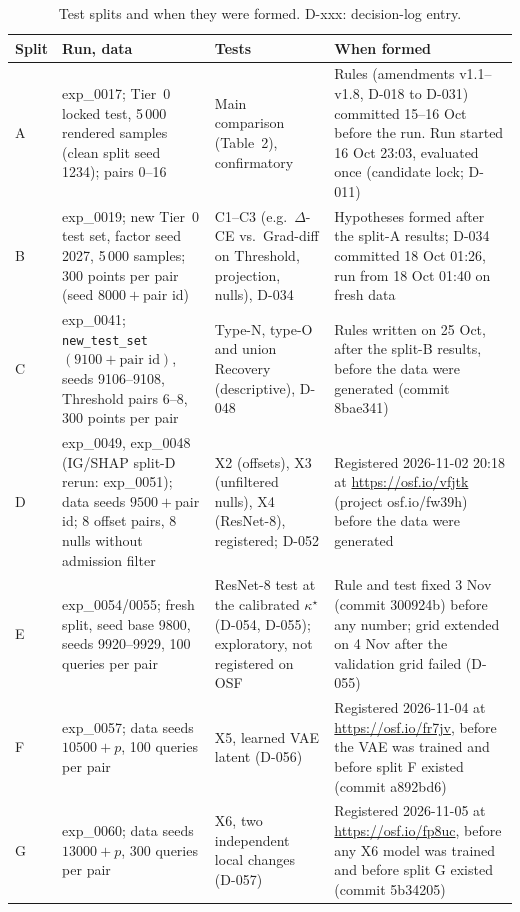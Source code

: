 \documentclass[10pt,a4paper]{article}
\theoremstyle{remark}
\begin{document}
\begin{table}[h]
\caption{Test splits and when they were formed. D-xxx: decision-log entry.}\label{tab:splits}
\centering\scriptsize
\setlength{\tabcolsep}{3pt}
\begin{tabular}{@{}l>{\raggedright\arraybackslash}p{2.6cm}>{\raggedright\arraybackslash}p{4.0cm}>{\raggedright\arraybackslash}p{5.2cm}@{}}
\toprule
Split & Run, data & Tests & When formed\\
\midrule
A & exp\_0017; Tier~0 locked test, 5\,000 rendered samples (clean split seed 1234); pairs 0--16 & Main comparison (Table~2), confirmatory & Rules (amendments v1.1--v1.8, D-018 to D-031) committed 15--16 Oct before the run. Run started 16 Oct 23:03, evaluated once (candidate lock; D-011)\\
B & exp\_0019; new Tier~0 test set, factor seed 2027, 5\,000 samples; 300 points per pair (seed $8000+$pair id) & C1--C3 (e.g.\ $\Delta$-CE vs.\ Grad-diff on Threshold, projection, nulls), D-034 & Hypotheses formed after the split-A results; D-034 committed 18 Oct 01:26, run from 18 Oct 01:40 on fresh data\\
C & exp\_0041; \texttt{new\_test\_set}$(9100+\text{pair id})$, seeds 9106--9108, Threshold pairs 6--8, 300 points per pair & Type-N, type-O and union Recovery (descriptive), D-048 & Rules written on 25 Oct, after the split-B results, before the data were generated (commit 8bae341)\\
D & exp\_0049, exp\_0048 (IG/SHAP split-D rerun: exp\_0051); data seeds $9500+$pair id; 8 offset pairs, 8 nulls without admission filter & X2 (offsets), X3 (unfiltered nulls), X4 (ResNet-8), registered; D-052 & Registered 2026-11-02 20:18 at \url{https://osf.io/vfjtk} (project osf.io/fw39h) before the data were generated\\
E & exp\_0054/0055; fresh split, seed base 9800, seeds 9920--9929, 100 queries per pair & ResNet-8 test at the calibrated $\kappa^\star$ (D-054, D-055); exploratory, not registered on OSF & Rule and test fixed 3 Nov (commit 300924b) before any number; grid extended on 4 Nov after the validation grid failed (D-055)\\
F & exp\_0057; data seeds $10500+p$, 100 queries per pair & X5, learned VAE latent (D-056) & Registered 2026-11-04 at \url{https://osf.io/fr7jv}, before the VAE was trained and before split F existed (commit a892bd6)\\
G & exp\_0060; data seeds $13000+p$, 300 queries per pair & X6, two independent local changes (D-057) & Registered 2026-11-05 at \url{https://osf.io/fp8uc}, before any X6 model was trained and before split G existed (commit 5b34205)\\
\bottomrule
\end{tabular}
\end{table}
\end{document}
